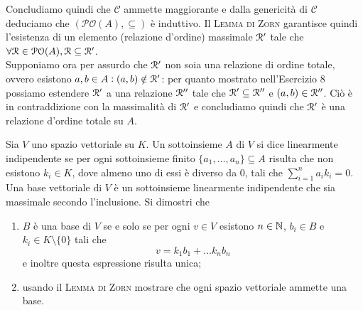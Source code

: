 \documentclass[a4paper]{article}\par \usepackage{style}\par
\begin{document}
Concludiamo quindi che $ \mathscr{C} $ ammette maggiorante e dalla genericità di $ \mathscr{C} $ deduciamo che $ (\mathcal{PO}(A), \subseteq) $ è induttivo. Il \textsc{Lemma di Zorn} garantisce quindi l'esistenza di un elemento (relazione d'ordine) massimale $ \mathcal{R}' $ tale che $ \forall \mathcal{R} \in \mathcal{PO}(A), \mathcal{R} \subseteq \mathcal{R}' $. \\
Supponiamo ora per assurdo che $ \mathcal{R}' $ non soia una relazione di ordine totale, ovvero esistono $ a, b \in A : (a, b) \notin \mathcal{R}' $: per quanto mostrato nell'Esercizio 8 possiamo estendere $ \mathcal{R}' $ a una relazione $ \mathcal{R}'' $ tale che $ \mathcal{R}' \subseteq \mathcal{R}'' $ e $ (a, b) \in \mathcal{R}'' $. Ciò è in contraddizione con la massimalità di $ \mathcal{R}' $ e concludiamo quindi che $ \mathcal{R}' $ è una relazione d'ordine totale su $ A $.\par \begin{es}
  Sia $ V $ uno spazio vettoriale su $ K $. Un sottoinsieme  $ A $ di $ V $ si dice linearmente indipendente se per ogni sottoinsieme finito $ \{a_1, \dots, a_n\} \subseteq A $ risulta che non esistono $ k_i \in K $, dove almeno uno di essi è diverso da 0, tali che $ \sum_{i = 1}^{n}a_i k_i = 0 $. Una base vettoriale di $ V $ è un sottoinsieme linearmente indipendente che sia massimale secondo l'inclusione. Si dimostri che
  \begin{enumerate}
  \item $ B $ è una base di $ V $ se e solo se per ogni $ v \in V $ esistono $ n \in \mathbb{N} $, $ b_i \in B $ e $ k_i \in K \setminus\{0\} $ tali che \[v = k_1 b_1 + \dots k_n b_n\] e inoltre questa espressione risulta unica;
  \item usando il \textsc{Lemma di Zorn} mostrare che ogni spazio vettoriale ammette una base.
  \end{enumerate}
\end{es}
\end{document}
